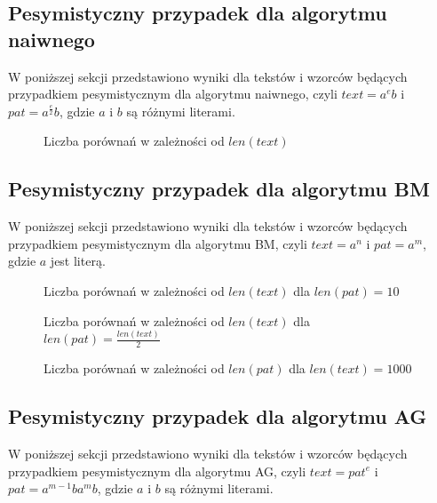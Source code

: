 \FloatBarrier
\subsection{Pesymistyczny przypadek dla algorytmu naiwnego}
W poniższej sekcji przedstawiono wyniki dla tekstów i wzorców będących przypadkiem pesymistycznym dla algorytmu naiwnego, czyli $text = a^{e}b$ i $pat = a^{\frac{e}{2}}b$, gdzie $a$ i $b$ są różnymi literami.

\begin{figure}[htb]
    \centering
    
    \hfill
    \caption{Liczba porównań w zależności od $len(text)$}
    \label{fig:result_bf_hard_plot}
\end{figure}

\FloatBarrier
\subsection{Pesymistyczny przypadek dla algorytmu BM}
W poniższej sekcji przedstawiono wyniki dla tekstów i wzorców będących przypadkiem pesymistycznym dla algorytmu BM, czyli $text = a^{n}$ i $pat = a^{m}$, gdzie $a$ jest literą.

\begin{figure}[htb]
    \centering
    
    \hfill
    \caption{Liczba porównań w zależności od $len(text)$ dla $len(pat) = 10$}
    \label{fig:result_bm_hard_pat_10_plot}
\end{figure}

\begin{figure}[htb]
    \centering
    
    \hfill
    \caption{Liczba porównań w zależności od $len(text)$ dla $len(pat) = \frac{len(text)}{2}$}
    \label{fig:result_bm_hard_pat_len(text)2_plot}
\end{figure}

\begin{figure}[htb]
    \centering
    
    \hfill
    \caption{Liczba porównań w zależności od $len(pat)$ dla $len(text) = 1000$}
    \label{fig:result_bm_hard_text_1000_plot}
\end{figure}

\FloatBarrier
\subsection{Pesymistyczny przypadek dla algorytmu AG}
W poniższej sekcji przedstawiono wyniki dla tekstów i wzorców będących przypadkiem pesymistycznym dla algorytmu AG, czyli $text = pat^{e}$ i $pat = a^{m-1}ba^{m}b$, gdzie $a$ i $b$ są różnymi literami.

